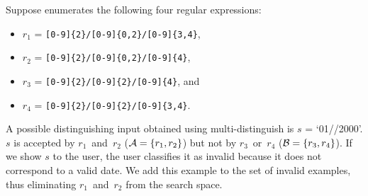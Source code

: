 \begin{example}
Suppose \Forest{} enumerates the following four regular expressions:
\begin{itemize}[label={},nosep]
    \item \(r_1\) = \verb`[0-9]{2}/[0-9]{0,2}/[0-9]{3,4}`,
    \item \(r_2\) = \verb`[0-9]{2}/[0-9]{0,2}/[0-9]{4}`,
    \item \(r_3\) = \verb`[0-9]{2}/[0-9]{2}/[0-9]{4}`, and
    \item \(r_4\) = \verb`[0-9]{2}/[0-9]{2}/[0-9]{3,4}`.
\end{itemize}
%
A possible distinguishing input obtained using multi-distinguish is \(s\) = `01//2000'. \(s\) is accepted by \(r_1\)~and~\(r_2\) (\({\mathcal{A}} = \{r_1, r_2\}\)) but not by \(r_3\)~or~\(r_4\) (\({\mathcal{B}} = \{r_3, r_4\}\)). If we show \(s\) to the user, the user classifies it as invalid because it does not correspond to a valid date. We add this example to the set of invalid examples, thus eliminating \(r_1\)~and~\(r_2\) from the search space.
\end{example}
